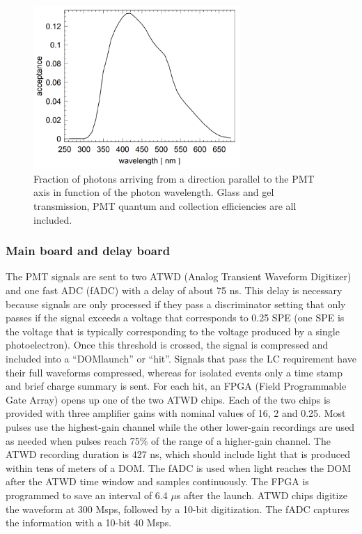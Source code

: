\begin{figure}[ht]
\centering
\includegraphics[width=0.7\textwidth]{chapter5/img/acceptanceDOM.png}
\caption{Fraction of photons arriving from a direction parallel to the PMT axis in function of the photon wavelength. Glass and gel transmission, PMT quantum and collection efficiencies are all included.}
\label{fig:acceptance}
\end{figure}


\subsubsection{Main board and delay board}
\label{subsec:mainboard}
The PMT signals are sent to two ATWD (Analog Transient Waveform Digitizer) and one fast ADC (fADC) with a delay of about 75 ns. This delay is necessary because signals are only processed if they pass a discriminator setting that only passes if the signal exceeds a voltage that corresponds to 0.25 SPE (one SPE is the voltage that is typically corresponding to the voltage produced by a single photoelectron). Once this threshold is crossed, the signal is compressed and included into a ``DOMlaunch'' or ``hit''. Signals that pass the LC requirement have their full waveforms compressed, whereas for isolated events only a time stamp and brief charge summary is sent. For each hit, an FPGA  (Field Programmable Gate Array) opens up one of the two ATWD chips. Each of the two chips is provided with three amplifier gains with nominal values of 16, 2 and 0.25. Most pulses use the highest-gain channel while the other lower-gain recordings are used as needed when pulses reach 75\% of the range of a higher-gain channel. The ATWD recording duration is 427 ns, which should include light that is produced within tens of meters of a DOM. The fADC is used when light reaches the DOM after the ATWD time window and samples continuously. The FPGA is programmed to save an interval of 6.4 $\mu$s after the launch. ATWD chips digitize the waveform at 300 Msps, followed by a 10-bit digitization. The fADC captures the information with a 10-bit 40 Msps.

